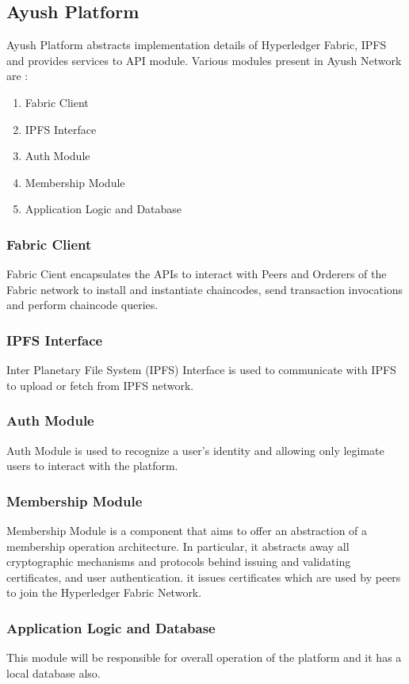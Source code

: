 \documentclass[11pt]{report}
\begin{document}
\subsection{Ayush Platform}
Ayush Platform abstracts implementation details of Hyperledger Fabric, IPFS and provides services to API module. Various modules present in Ayush Network are :
\begin{enumerate}
    \item Fabric Client
    \item IPFS Interface
    \item Auth Module
    \item Membership Module
    \item Application Logic and Database
\end{enumerate}

\subsubsection{Fabric Client}
Fabric Cient encapsulates the APIs to interact with Peers and Orderers of the Fabric network to install and instantiate chaincodes, send transaction invocations and perform chaincode queries.

\subsubsection{IPFS Interface}
Inter Planetary File System (IPFS) Interface is used to communicate with IPFS to upload or fetch from IPFS network.
\subsubsection{Auth Module}
Auth Module is used to recognize a user's identity and allowing only legimate users to interact with the platform.

\subsubsection{Membership Module}
Membership Module is a component that aims to offer an abstraction of a membership operation architecture. In particular, it abstracts away all cryptographic mechanisms and protocols behind issuing and validating certificates, and user authentication. it issues certificates which are used by peers to join the Hyperledger Fabric Network.

\subsubsection{Application Logic and Database}
This module will be responsible for overall operation of the platform and it has a local database also.
\end{document}
